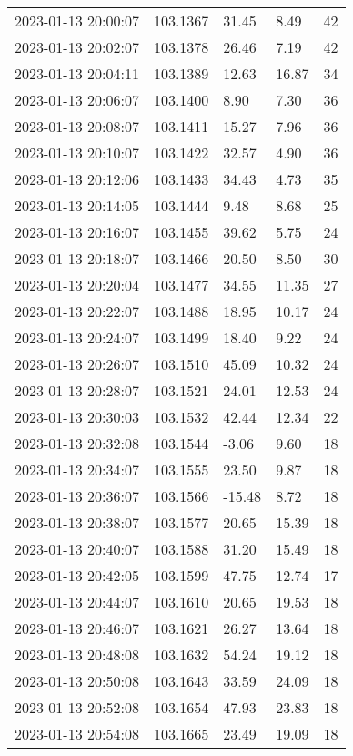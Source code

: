 \documentclass{nature_plusfigure}
\begin{document}
\begin{supplement}
\begin{center}
\begin{longtable}{lllll}
2023-01-13 20:00:07 & 103.1367 & 31.45 & 8.49 & 42 \\ 
2023-01-13 20:02:07 & 103.1378 & 26.46 & 7.19 & 42 \\ 
2023-01-13 20:04:11 & 103.1389 & 12.63 & 16.87 & 34 \\ 
2023-01-13 20:06:07 & 103.1400 & 8.90 & 7.30 & 36 \\ 
2023-01-13 20:08:07 & 103.1411 & 15.27 & 7.96 & 36 \\ 
2023-01-13 20:10:07 & 103.1422 & 32.57 & 4.90 & 36 \\ 
2023-01-13 20:12:06 & 103.1433 & 34.43 & 4.73 & 35 \\ 
2023-01-13 20:14:05 & 103.1444 & 9.48 & 8.68 & 25 \\ 
2023-01-13 20:16:07 & 103.1455 & 39.62 & 5.75 & 24 \\ 
2023-01-13 20:18:07 & 103.1466 & 20.50 & 8.50 & 30 \\ 
2023-01-13 20:20:04 & 103.1477 & 34.55 & 11.35 & 27 \\ 
2023-01-13 20:22:07 & 103.1488 & 18.95 & 10.17 & 24 \\ 
2023-01-13 20:24:07 & 103.1499 & 18.40 & 9.22 & 24 \\ 
2023-01-13 20:26:07 & 103.1510 & 45.09 & 10.32 & 24 \\ 
2023-01-13 20:28:07 & 103.1521 & 24.01 & 12.53 & 24 \\ 
2023-01-13 20:30:03 & 103.1532 & 42.44 & 12.34 & 22 \\ 
2023-01-13 20:32:08 & 103.1544 & -3.06 & 9.60 & 18 \\ 
2023-01-13 20:34:07 & 103.1555 & 23.50 & 9.87 & 18 \\ 
2023-01-13 20:36:07 & 103.1566 & -15.48 & 8.72 & 18 \\ 
2023-01-13 20:38:07 & 103.1577 & 20.65 & 15.39 & 18 \\ 
2023-01-13 20:40:07 & 103.1588 & 31.20 & 15.49 & 18 \\ 
2023-01-13 20:42:05 & 103.1599 & 47.75 & 12.74 & 17 \\ 
2023-01-13 20:44:07 & 103.1610 & 20.65 & 19.53 & 18 \\ 
2023-01-13 20:46:07 & 103.1621 & 26.27 & 13.64 & 18 \\ 
2023-01-13 20:48:08 & 103.1632 & 54.24 & 19.12 & 18 \\ 
2023-01-13 20:50:08 & 103.1643 & 33.59 & 24.09 & 18 \\ 
2023-01-13 20:52:08 & 103.1654 & 47.93 & 23.83 & 18 \\ 
2023-01-13 20:54:08 & 103.1665 & 23.49 & 19.09 & 18 \\ 

\end{longtable}
\end{center}
\end{supplement}
\end{document}

